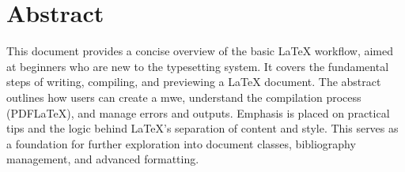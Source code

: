 \section*{Abstract}

This document provides a concise overview of the basic \LaTeX{} workflow, aimed at beginners who are new to the typesetting system.
It covers the fundamental steps of writing, compiling, and previewing a \LaTeX{} document.
The abstract outlines how users can create a \acrfull{mwe}, understand the compilation process (PDFLaTeX), and manage errors and outputs.
Emphasis is placed on practical tips and the logic behind \LaTeX's separation of content and style.
This serves as a foundation for further exploration into document classes, bibliography management, and advanced formatting.
